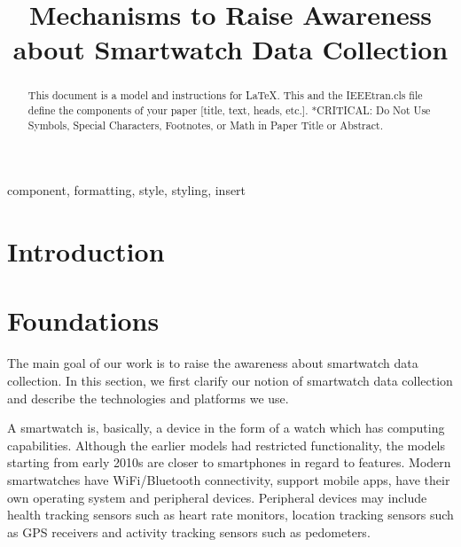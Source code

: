 \documentclass[conference, a4paper, 10pt, twocolumn]{IEEEtran}
\begin{document}
\title{Mechanisms to Raise Awareness about Smartwatch Data Collection}

\author{
	\and
}

\maketitle
\thispagestyle{plain}
\pagestyle{plain}


\begin{abstract}
This document is a model and instructions for \LaTeX.
This and the IEEEtran.cls file define the components of your paper [title, text, heads, etc.]. *CRITICAL: Do Not Use Symbols, Special Characters, Footnotes, 
or Math in Paper Title or Abstract.
\end{abstract}

\begin{IEEEkeywords}
component, formatting, style, styling, insert
\end{IEEEkeywords}

\section{Introduction}

\section{Foundations}

The main goal of our work is to raise the awareness about smartwatch data collection. In this section, we first clarify our notion of smartwatch data collection and describe the technologies and platforms we use. 

A smartwatch is, basically, a device in the form of a watch which has computing capabilities. Although the earlier models had restricted functionality, the models starting from early 2010s are closer to smartphones in regard to features. Modern smartwatches have WiFi/Bluetooth connectivity, support mobile apps, have their own operating system and peripheral devices. Peripheral devices may include health tracking sensors such as heart rate monitors, location tracking sensors such as GPS receivers and activity tracking sensors such as pedometers.\cite{smartwatchWiki}
\end{document}
